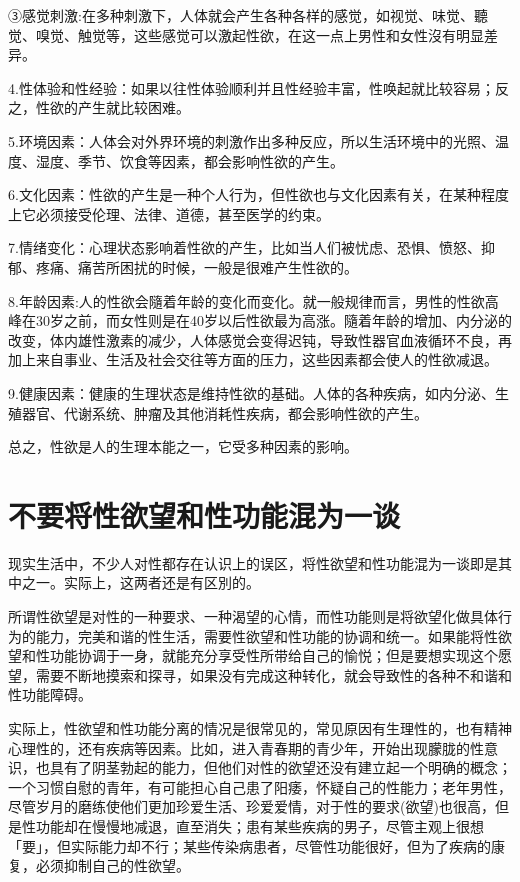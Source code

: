 \documentclass[12pt,UTF8]{ctexbook}
\begin{document}
③感觉刺激:在多种刺激下，人体就会产生各种各样的感觉，如视觉、味觉、聽觉、嗅觉、触觉等，这些感觉可以激起性欲，在这一点上男性和女性沒有明显差异。

4.性体验和性经验：如果以往性体验顺利并且性经验丰富，性唤起就比较容易；反之，性欲的产生就比较困难。

5.环境因素：人体会对外界环境的刺激作出多种反应，所以生活环境中的光照、温度、湿度、季节、饮食等因素，都会影响性欲的产生。

6.文化因素：性欲的产生是一种个人行为，但性欲也与文化因素有关，在某种程度上它必须接受伦理、法律、道德，甚至医学的约束。

7.情绪变化：心理状态影响着性欲的产生，比如当人们被忧虑、恐惧、愤怒、抑郁、疼痛、痛苦所困扰的时候，一般是很难产生性欲的。

8.年龄因素:人的性欲会隨着年龄的变化而变化。就一般规律而言，男性的性欲高峰在30岁之前，而女性则是在40岁以后性欲最为高涨。隨着年龄的增加、内分泌的改变，体内雄性激素的减少，人体感觉会变得迟钝，导致性器官血液循环不良，再加上来自事业、生活及社会交往等方面的压力，这些因素都会使人的性欲减退。

9.健康因素：健康的生理状态是维持性欲的基础。人体的各种疾病，如内分泌、生殖器官、代谢系统、肿瘤及其他消耗性疾病，都会影响性欲的产生。

总之，性欲是人的生理本能之一，它受多种因素的影响。

\chapter{不要将性欲望和性功能混为一谈}

现实生活中，不少人对性都存在认识上的误区，将性欲望和性功能混为一谈即是其中之一。实际上，这两者还是有区別的。

所谓性欲望是对性的一种要求、一种渴望的心情，而性功能则是将欲望化做具体行为的能力，完美和谐的性生活，需要性欲望和性功能的协调和统一。如果能将性欲望和性功能协调于一身，就能充分享受性所带给自己的愉悦；但是要想实现这个愿望，需要不断地摸索和探寻，如果没有完成这种转化，就会导致性的各种不和谐和性功能障碍。

实际上，性欲望和性功能分离的情况是很常见的，常见原因有生理性的，也有精神心理性的，还有疾病等因素。比如，进入青春期的青少年，开始出现朦胧的性意识，也具有了阴茎勃起的能力，但他们对性的欲望还没有建立起一个明确的概念；一个习惯自慰的青年，有可能担心自己患了阳痿，怀疑自己的性能力；老年男性，尽管岁月的磨练使他们更加珍爱生活、珍爱爱情，对于性的要求(欲望)也很高，但是性功能却在慢慢地减退，直至消失；患有某些疾病的男子，尽管主观上很想「要」，但实际能力却不行；某些传染病患者，尽管性功能很好，但为了疾病的康复，必须抑制自己的性欲望。
\end{document}
